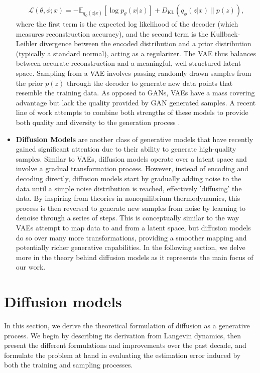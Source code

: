\begin{itemize}
    \begin{align}
        \mathcal{L}(\theta, \phi; x) = -\mathbb{E}_{q_{\phi}(z|x)}[\log p_{\theta}(x|z)] + D_{\text{KL}}(q_{\phi}(z|x) \| p(z)),
    \end{align}
    where the first term is the expected log likelihood of the decoder (which measures reconstruction accuracy), and the second term is the Kullback-Leibler divergence between the encoded distribution and a prior distribution (typically a standard normal), acting as a regularizer. The VAE thus balances between accurate reconstruction and a meaningful, well-structured latent space. Sampling from a VAE involves passing randomly drawn samples from the prior $p(z)$ through the decoder to generate new data points that resemble the training data. As opposed to GANs, VAEs have a mass covering advantage but lack the quality provided by GAN generated samples. A recent line of work attempts to combine both strengths of these models to provide both quality and diversity to the generation process \citep{gimenez2022unifiedfdivergenceframeworkgeneralizing}.
    \item  \textbf{Diffusion Models} are another class of generative models that have recently gained significant attention due to their ability to generate high-quality samples. Similar to VAEs, diffusion models operate over a latent space and involve a gradual transformation process. However, instead of encoding and decoding directly, diffusion models start by gradually adding noise to the data until a simple noise distribution is reached, effectively 'diffusing' the data. By inspiring from theories in nonequilibrium thermodynamics, this process is then reversed to generate new samples from noise by learning to denoise through a series of steps. This is conceptually similar to the way VAEs attempt to map data to and from a latent space, but diffusion models do so over many more transformations, providing a smoother mapping and potentially richer generative capabilities. In the following section, we delve more in the theory behind diffusion models as it represents the main focus of our work.
\end{itemize}

\section{Diffusion models}\label{sec:related:sec2}
In this section, we derive the theoretical formulation of diffusion as a generative process. We begin by describing its derivation from Langevin dynamics, then present the different formulations and improvements over the past decade, and formulate the problem at hand in evaluating the estimation error induced by both the training and sampling processes.

